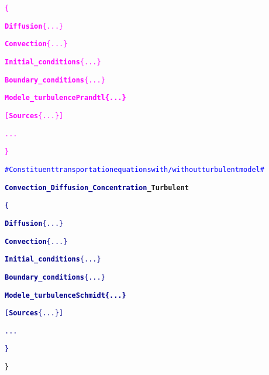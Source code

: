 \begin{center}
{\begin{minipage}[c]{0.98\textwidth}
\begin{alltt}
\hspace{1cm}    \textcolor{magenta}{\{}

\hspace{2cm}        \textcolor{magenta}{{\bf{Diffusion}} \{ ... \}}

\hspace{2cm}        \textcolor{magenta}{{\bf{Convection}} \{ ... \}}

\hspace{2cm}        \textcolor{magenta}{{\bf{Initial\_conditions}} \{ ... \}}

\hspace{2cm}        \textcolor{magenta}{{\bf{Boundary\_conditions}} \{ ... \}}

\hspace{2cm}        \textcolor{magenta}{{\bf{\textcolor{Greeen}{Modele\_turbulence Prandtl \{ ... \} } }}}

\hspace{2cm}        \textcolor{magenta}{[{\bf{Sources}} \{ ... \}]}

\hspace{2cm}        \textcolor{magenta}{...}

\hspace{1cm}    \textcolor{magenta}{\}}

\hspace{1cm}    \textcolor{blue}{\# Constituent transportation equations with/without turbulent model \#}

\hspace{1cm}    {\bf{\textcolor{darkblue}{Convection\_Diffusion\_Concentration}\textcolor{Greeen}{\_Turbulent}}}

\hspace{1cm}    \textcolor{darkblue}{\{}

\hspace{2cm}        \textcolor{darkblue}{{\bf{Diffusion}} \{ ... \}}

\hspace{2cm}        \textcolor{darkblue}{{\bf{Convection}} \{ ... \}}

\hspace{2cm}        \textcolor{darkblue}{{\bf{Initial\_conditions}} \{ ... \}}

\hspace{2cm}        \textcolor{darkblue}{{\bf{Boundary\_conditions}} \{ ... \}}

\hspace{2cm}        \textcolor{darkblue}{{\bf{\textcolor{Greeen}{Modele\_turbulence Schmidt \{ ... \} } }}}

\hspace{2cm}        \textcolor{darkblue}{[{\bf{Sources}} \{ ... \}]}

\hspace{2cm}        \textcolor{darkblue}{...}

\hspace{1cm}    \textcolor{darkblue}{\}}

\}
\end{alltt}
\end{minipage}}
\end{center}

